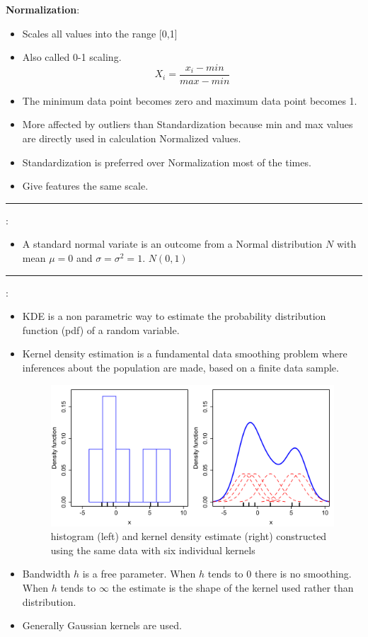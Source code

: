 \documentclass[	DIV=calc,%
paper=a4,%
fontsize=11pt,%
twocolumn]{scrartcl} %
\newcommand{\hformbar}[1]{\vspace{5pt}\hrule\vspace{10pt}} %
\newcommand{\formdesc}[1]{\noindent\textbf{#1}}
\begin{document}
\formdesc{Normalization}:

\begin{itemize}
	\item Scales all values into the range [0,1]
	\item Also called 0-1 scaling.
	$$X_i=\frac{x_i-{min}}{{max}-{min}}$$
	\item The minimum data point becomes zero and maximum data point becomes 1.
	\item More affected by outliers than Standardization because min and max values are directly used in calculation Normalized values.
	\item Standardization is preferred over Normalization most of the times.
	\item Give features the same scale.
\end{itemize}
\hformbar

\formdesc{Standard Normal variate}:
\begin{itemize}
	\item A standard normal variate is an outcome from a Normal distribution $N$ with mean $\mu=0$ and $\sigma=\sigma^2=1$.  $N(0,1)$
	
\end{itemize}

\hformbar

\formdesc{KDE (Kernel density estimation)}:
\begin{itemize}
	\item KDE is a non parametric way to estimate the probability distribution function (pdf) of a random variable.
	\item Kernel density estimation is a fundamental data smoothing problem where inferences about the population are made, based on a finite data sample.
		\begin{figure}[ht!]
		\centering
		\caption{histogram (left) and kernel density estimate (right) constructed using the same data with six individual kernels}
		\graphicspath{ {images/math/} }
		\includegraphics[width=\linewidth]{comparison_of_1d_histogram_and_kde.png}
	\end{figure}
	\item Bandwidth $h$ is a free parameter. When $h$ tends to 0 there is no smoothing. When $h$ tends to $\infty$ the estimate is the shape of the kernel used rather than distribution.
	\item Generally Gaussian kernels are used.
\end{itemize}
\end{document}
